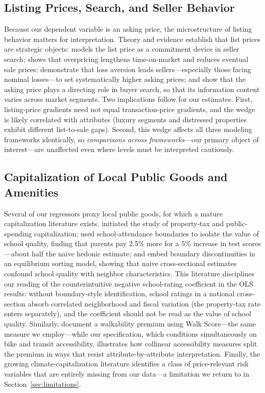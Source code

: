 \subsection{Listing Prices, Search, and Seller Behavior}

Because our dependent variable is an asking price, the microstructure of listing
behavior matters for interpretation. Theory and evidence establish that list prices
are strategic objects: \citet{horowitz1992role} models the list price as a
commitment device in seller search; \citet{knight2002listing} shows that
overpricing lengthens time-on-market and reduces eventual sale prices;
\citet{genesove2001loss} demonstrate that loss aversion leads sellers---especially
those facing nominal losses---to set systematically higher asking prices; and
\citet{han2016role} show that the asking price plays a directing role in buyer
search, so that its information content varies across market segments. Two
implications follow for our estimates. First, listing-price gradients need not
equal transaction-price gradients, and the wedge is likely correlated with
attributes (luxury segments and distressed properties exhibit different list-to-sale
gaps). Second, this wedge affects all three modeling frameworks identically, so
\emph{comparisons across frameworks}---our primary object of interest---are
unaffected even where levels must be interpreted cautiously.

\subsection{Capitalization of Local Public Goods and Amenities}

Several of our regressors proxy local public goods, for which a mature
capitalization literature exists. \citet{oates1969effects} initiated the study of
property-tax and public-spending capitalization; \citet{black1999better} used
school-attendance boundaries to isolate the value of school quality, finding that
parents pay 2.5\% more for a 5\% increase in test scores---about half the naive
hedonic estimate; and
\citet{bayer2007unified} embed boundary discontinuities in an equilibrium sorting
model, showing that naive cross-sectional estimates confound school quality with
neighbor characteristics. This literature disciplines our reading of the
counterintuitive negative school-rating coefficient in the OLS results: without
boundary-style identification, school ratings in a national cross-section absorb
correlated neighborhood and fiscal variation (the property-tax rate enters
separately), and the coefficient should not be read as the value of school quality.
Similarly, \citet{pivo2011walkability} document a walkability premium using Walk
Score---the same measure we employ---while our specification, which conditions
simultaneously on bike and transit accessibility, illustrates how collinear
accessibility measures split the premium in ways that resist attribute-by-attribute
interpretation. Finally, the growing climate-capitalization literature
\citep{baldauf2020does, bernstein2019disaster, murfin2020risk} identifies a class
of price-relevant risk variables that are entirely missing from our data---a
limitation we return to in Section~\ref{sec:limitations}.

